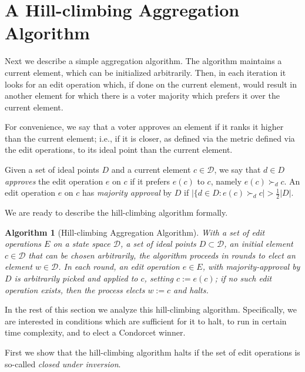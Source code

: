 \documentclass[sigconf]{aamas}  %
\newtheorem{algorithm}{Algorithm}
\newcommand{\calD}{\mathcal{D}}
\newcommand{\prefers}[1]{\succ_{#1}}
\begin{document}
\section{A Hill-climbing Aggregation Algorithm}

Next we describe a simple aggregation algorithm. 
The algorithm maintains a current element, which can be initialized arbitrarily. Then, in each iteration it looks for an edit operation which, if done on the current element, would result in another element for which there is a voter majority which prefers it over the current element. 

For convenience, we say that a voter approves an element if it ranks it higher than the current element; i.e., if it is closer, as defined via the metric defined via the edit operations, to its ideal point than the current element.

\begin{definition}
%
Given a set of ideal points $D$ and a current element $c \in \calD$,  we say that $d \in D$ \emph{approves} the edit operation $e$ on $c$ if it prefers $e(c)$ to $c$, namely $e(c) \prefers{d} c$.  An edit operation $e$ on $c$ has \emph{majority approval} by $D$ if $|\{d \in D : e(c) \prefers{d} c| > \frac{1}{2}{|D|}$.
%
\end{definition}

We are ready to describe the hill-climbing algorithm formally.

\begin{algorithm}[Hill-climbing Aggregation Algorithm]\label{algorithm:iva}
With a set of edit operations $E$ on a state space $\calD$, a set of ideal points $D \subset \calD$, an initial element $c \in \calD$ that can be chosen arbitrarily, the algorithm proceeds in rounds to elect an element $w \in \calD$.   In each round, an edit operation $e \in E$, with majority-approval by $D$ is arbitrarily picked and applied to $c$, setting $c := e(c)$;
if no such edit operation exists, then the process elects $w:=c$ and halts.
\end{algorithm}

In the rest of this section we analyze this hill-climbing algorithm. Specifically, we are interested in conditions which are sufficient for it to halt, to run in certain time complexity, and to elect a Condorcet winner.

First we show that the hill-climbing algorithm halts if the set of edit operations is so-called \emph{closed under inversion}.
\end{document}
